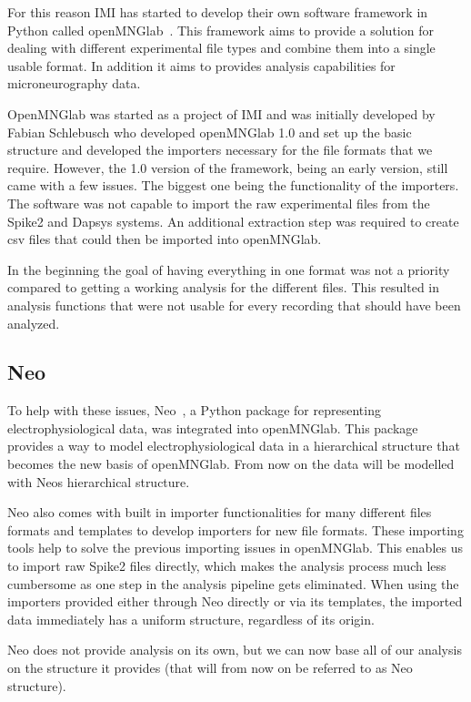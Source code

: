 For this reason IMI has started to develop their own software framework in Python called openMNGlab~\cite{schlebusch_openmnglab_2021}.  This framework aims to provide a solution for dealing with different experimental file types and combine them into a single usable format.  In addition it aims to provides analysis capabilities for microneurography data.

OpenMNGlab was started as a project of IMI and was initially developed by Fabian Schlebusch who developed openMNGlab 1.0 and set up the basic structure and developed the importers necessary for the file formats that we require. However, the 1.0 version of the framework, being an early version,  still came with a few issues. The biggest one being the functionality of the importers. The software was not capable to import the raw experimental files from the Spike2 and Dapsys systems. An additional extraction step was required to create csv files that could then be imported into openMNGlab. 

In the beginning the goal of having everything in one format was not a priority compared to getting a working analysis for the different files. This resulted in analysis functions that were not usable for every recording that should have been analyzed.

\subsection{Neo}
To help with these issues, Neo~\cite{neo14}, a Python package for representing electrophysiological data, was integrated into openMNGlab. This package provides a way to model electrophysiological data in a hierarchical structure that becomes the new basis of openMNGlab. From now on the data will be modelled with Neos hierarchical structure. 

Neo also comes with built in importer functionalities for many different files formats and templates to develop importers for new file formats.  These importing tools help to solve the previous importing issues in openMNGlab. This enables us to import raw Spike2 files directly, which makes the analysis process much less cumbersome as one step in the analysis pipeline gets eliminated. When using the importers provided either through Neo directly or via its templates, the imported data immediately has a uniform structure, regardless of its origin.

Neo does not provide analysis on its own, but we can now base all of our analysis on the structure it provides (that will from now on be referred to as Neo structure). \\

